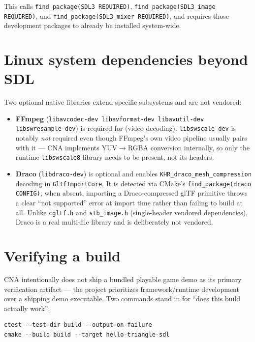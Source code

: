 This calls \texttt{find\_package(SDL3 REQUIRED)}, \texttt{find\_package(SDL3\_image REQUIRED)},
and \texttt{find\_package(SDL3\_mixer REQUIRED)}, and requires those development packages to
already be installed system-wide.

\section{Linux system dependencies beyond SDL}

Two optional native libraries extend specific subsystems and are not vendored:

\begin{itemize}
  \item \textbf{FFmpeg} (\texttt{libavcodec-dev libavformat-dev libavutil-dev
        libswresample-dev}) is required for  (video decoding).
        \texttt{libswscale-dev} is notably \emph{not} required even though FFmpeg's own video
        pipeline usually pairs with it --- CNA implements YUV$\to$RGBA conversion internally,
        so only the runtime \texttt{libswscale8} library needs to be present, not its headers.
  \item \textbf{Draco} (\texttt{libdraco-dev}) is optional and enables
        \texttt{KHR\_draco\_mesh\_compression} decoding in \texttt{GltfImportCore}. It is
        detected via CMake's \texttt{find\_package(draco CONFIG)}; when absent, importing a
        Draco-compressed glTF primitive throws a clear ``not supported'' error at import time
        rather than failing to build at all. Unlike \texttt{cgltf.h} and \texttt{stb\_image.h}
        (single-header vendored dependencies), Draco is a real multi-file library and is
        deliberately not vendored.
\end{itemize}

\section{Verifying a build}

CNA intentionally does not ship a bundled playable game demo as its primary verification
artifact --- the project prioritizes framework/runtime development over a shipping demo
executable. Two commands stand in for ``does this build actually work'':

\begin{lstlisting}[style=cnashell]
ctest --test-dir build --output-on-failure
cmake --build build --target hello-triangle-sdl
\end{lstlisting}

